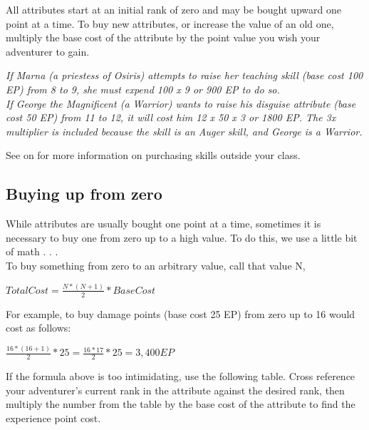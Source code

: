 \begin{multicols*}{2}
All attributes start at an initial rank of zero and may be bought upward one point at a time. To buy new attributes, or increase the value of an old one, multiply the base cost of the attribute by the point value you wish your adventurer to gain.

\textit{If Marna (a priestess of Osiris) attempts to raise her teaching skill (base cost 100 EP) from 8 to 9, she must expend 100 x 9 or 900 EP to do so.\\
If George the Magnificent (a Warrior) wants to raise his disguise attribute (base cost 50 EP) from 11 to 12, it will cost him 12 x 50 x 3 or 1800 EP. The 3x multiplier is included because the skill is an Auger skill, and George is a Warrior.} 

See  on \tcpage{\pageref{create-skills}} for more information on purchasing skills outside your class.
\subsection{Buying up from zero}
While attributes are usually bought one point at a time, sometimes it is necessary to buy one from zero up to a high value. To do this, we use a little bit of math . . .\\
To buy something from zero to an arbitrary value, call that value N,
\begin{normbox}
\large
$Total Cost = \frac{N * (N+1)}{2} * Base Cost$
\end{normbox}
For example, to buy damage points (base cost 25 EP) from zero up to 16 would cost as follows:
\begin{normbox}
\large
$\frac{16 * (16+1)}{2} * 25 = \frac{16*17}{2} * 25 = 3,400 EP$
\end{normbox}
If the formula above is too intimidating, use the following table. Cross reference your adventurer's current rank in the attribute against the desired rank, then multiply the number from the table by the base cost of the attribute to find the experience point cost.
\end{multicols*}
